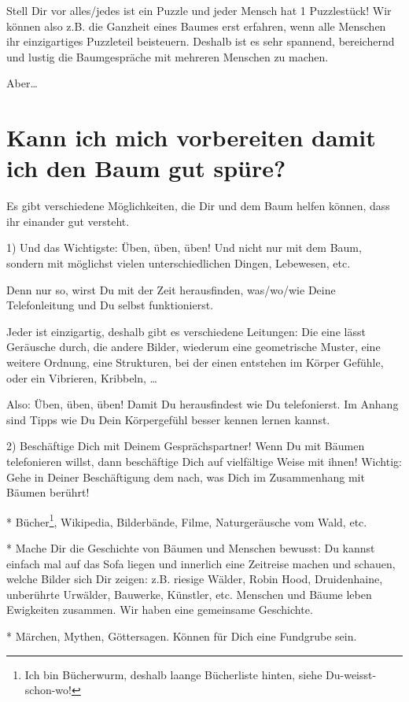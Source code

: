 \documentclass[11pt,titlepage,a5paper]{book}
\begin{document}
Stell Dir vor alles/jedes ist ein Puzzle und jeder Mensch hat 1 Puzzlestück! Wir können also z.B. die Ganzheit eines Baumes erst erfahren, wenn alle Menschen ihr einzigartiges Puzzleteil beisteuern. Deshalb ist es sehr spannend, bereichernd und lustig die Baumgespräche mit mehreren Menschen zu machen.

Aber\dots

\section{Kann ich mich vorbereiten damit ich den Baum gut spüre?}

Es gibt verschiedene Möglichkeiten, die Dir und dem Baum helfen können, dass ihr einander gut versteht.

1) Und das Wichtigste: Üben, üben, üben! Und nicht nur mit dem Baum, sondern mit möglichst vielen unterschiedlichen Dingen, Lebewesen, etc.

Denn nur so, wirst Du mit der Zeit herausfinden, was/wo/wie Deine Telefonleitung und Du selbst funktionierst. 

Jeder ist einzigartig, deshalb gibt es verschiedene Leitungen: Die eine lässt Geräusche durch, die andere Bilder, wiederum eine geometrische Muster, eine weitere Ordnung, eine Strukturen, bei der einen entstehen im Körper Gefühle, oder ein Vibrieren, Kribbeln, \dots

Also: Üben, üben, üben! Damit Du herausfindest wie Du telefonierst.
Im Anhang sind Tipps wie Du Dein Körpergefühl besser kennen lernen kannst.

2) Beschäftige Dich mit Deinem Gesprächspartner! Wenn Du mit Bäumen telefonieren willst, dann beschäftige Dich auf vielfältige Weise mit ihnen! Wichtig: Gehe in Deiner Beschäftigung dem nach, was Dich im Zusammenhang mit Bäumen berührt!

* Bücher\footnote{Ich bin Bücherwurm, deshalb laange Bücherliste hinten, siehe Du-weisst-schon-wo!}, Wikipedia, Bilderbände, Filme, Naturgeräusche vom Wald, etc.

* Mache Dir die Geschichte von Bäumen und Menschen bewusst:
Du kannst einfach mal auf das Sofa liegen und innerlich eine Zeitreise machen und schauen, welche Bilder sich Dir zeigen: z.B. riesige Wälder, Robin Hood, Druidenhaine, unberührte Urwälder, Bauwerke, Künstler, etc. Menschen und Bäume leben Ewigkeiten zusammen. Wir haben eine gemeinsame Geschichte.

* Märchen, Mythen, Göttersagen. Können für Dich eine Fundgrube sein.
\end{document}

